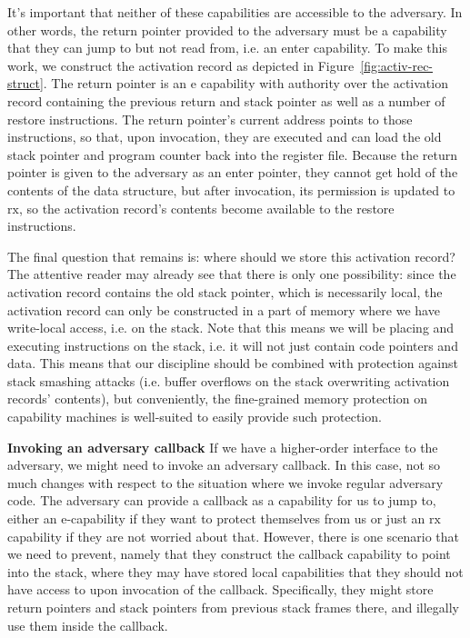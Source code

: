 \documentclass[compsoc,conference,letterpaper,fleqn]{IEEEtran}
\newcommand{\plainperm}[1]{\mathrm{#1}}
\newcommand{\exec}{\plainperm{rx}}
\newcommand{\entry}{\plainperm{e}}
\begin{document}
It's important that neither of these capabilities are accessible to the
adversary. In other words, the return pointer provided to the adversary must be
a capability that they can jump to but not read from, i.e. an enter
capability. To make this work, we construct the activation record as depicted in
Figure~\ref{fig:activ-rec-struct}. The return pointer is an $\entry$ capability
with authority over the activation record containing the previous return and
stack pointer as well as a number of restore instructions. The return pointer's
current address points to those instructions, so that, upon invocation, they are
executed and can load the old stack pointer and program counter back into the
register file. Because the return pointer is given to the adversary as an enter
pointer, they cannot get hold of the contents of the data structure, but after
invocation, its permission is updated to $\exec$, so the activation record's
contents become available to the restore instructions.

The final question that remains is: where should we store this activation
record? The attentive reader may already see that there is only one possibility:
since the activation record contains the old stack pointer, which is necessarily
local, the activation record can only be constructed in a part of memory where
we have write-local access, i.e. on the stack. Note that this means we will be
placing and executing instructions on the stack, i.e. it will not just contain
code pointers and data. This means that our discipline should be combined with
protection against stack smashing attacks (i.e. buffer overflows on the stack
overwriting activation records' contents), but conveniently, the fine-grained
memory protection on capability machines is well-suited to easily provide such
protection.

\textbf{Invoking an adversary callback} If we have a higher-order interface to
the adversary, we might need to invoke an adversary callback. In this case, not
so much changes with respect to the situation where we invoke regular adversary
code. The adversary can provide a callback as a capability for us to jump to,
either an $\entry$-capability if they want to protect themselves from us or just an
$\exec$ capability if they are not worried about that. However, there is one
scenario that we need to prevent, namely that they construct the callback
capability to point into the stack, where they may have stored local
capabilities that they should not have access to upon invocation of the callback.
Specifically, they might store return pointers and stack pointers from previous
stack frames there, and illegally use them inside the callback.
\end{document}
